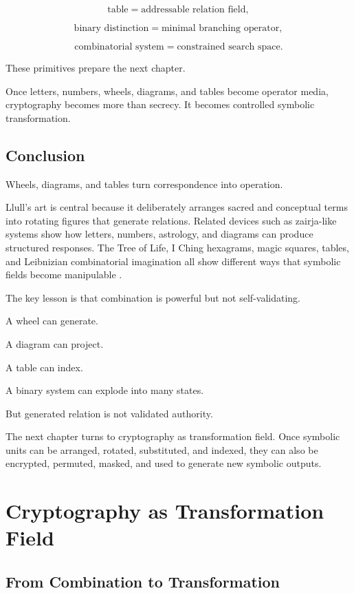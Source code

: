 \documentclass[11pt]{book}
\begin{document}
\[
\text{table} = \text{addressable relation field},
\]

\[
\text{binary distinction} = \text{minimal branching operator},
\]

\[
\text{combinatorial system} = \text{constrained search space}.
\]

These primitives prepare the next chapter.

Once letters, numbers, wheels, diagrams, and tables become operator media, cryptography becomes more than secrecy. It becomes controlled symbolic transformation.

\section{Conclusion}

Wheels, diagrams, and tables turn correspondence into operation.

Llull’s art is central because it deliberately arranges sacred and conceptual terms into rotating figures that generate relations. Related devices such as zairja-like systems show how letters, numbers, astrology, and diagrams can produce structured responses. The Tree of Life, I Ching hexagrams, magic squares, tables, and Leibnizian combinatorial imagination all show different ways that symbolic fields become manipulable \cite{Yates1966ArtMemory,Yates1964GiordanoBruno,Scholem1974Kabbalah,WilhelmBaynes1967IChing,Needham1959ScienceCivilisationChina3,Eco1995SearchPerfectLanguage}.

The key lesson is that combination is powerful but not self-validating.

A wheel can generate.

A diagram can project.

A table can index.

A binary system can explode into many states.

But generated relation is not validated authority.

The next chapter turns to cryptography as transformation field. Once symbolic units can be arranged, rotated, substituted, and indexed, they can also be encrypted, permuted, masked, and used to generate new symbolic outputs.

\chapter{Cryptography as Transformation Field}

\section{From Combination to Transformation}
\end{document}
